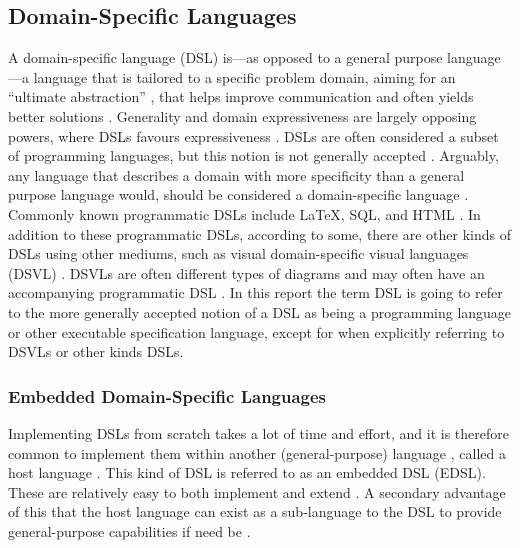 \newcommand{\dsl}{domain-specific language}
\subsection{Domain-Specific Languages}
A \dsl{} (DSL) is---as opposed to a general purpose language---a language that is tailored to a specific problem domain, aiming for an ``ultimate abstraction'' \cite{techniquesforedsls,buildingdsel}, that helps improve communication \cite{fowler_parsons_2010} and often yields better solutions \cite{annotatedbibl}. Generality and domain expressiveness are largely opposing powers, where DSLs favours expressiveness \cite{mernik_heering_sloane_2005}.
DSLs are often considered a subset of programming languages, but this notion is not generally accepted \cite{annotatedbibl,fowler_parsons_2010,dsvl}. Arguably, any language that describes a domain with more specificity than a general purpose language would, should be considered a \dsl{} \cite{dsvl}. Commonly known programmatic DSLs include \LaTeX, SQL, and HTML \cite{annotatedbibl}. In addition to these programmatic DSLs, according to some, there are other kinds of DSLs using other mediums, such as visual domain-specific visual languages (DSVL) \cite{dsvl}. %
DSVLs are often different types of diagrams and may often have an accompanying programmatic DSL \cite{dsvl}.
In this report the term DSL is going to refer to the more generally accepted notion of a DSL as being a programming language or other executable specification language, except for when explicitly referring to DSVLs or other kinds DSLs.




\subsubsection{Embedded Domain-Specific Languages}\label{sec:edsl}

Implementing DSLs from scratch takes a lot of time and effort, and it is therefore common to implement them within another (general-purpose) language \cite{buildingdsel}, called a host language \cite{techniquesforedsls}. This kind of DSL is referred to as an embedded DSL (EDSL). These are relatively easy to both implement and extend \cite{[needed]}. A secondary advantage of this that the host language can exist as a sub-language to the DSL to provide general-purpose capabilities if need be \cite{annotatedbibl}.

